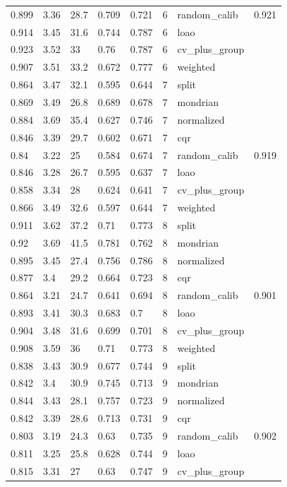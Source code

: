 \begin{tabular}{llllllll}
0.899 & 3.36 & 28.7 & 0.709 & 0.721 & 6 & random\_calib & 0.921 \\
0.914 & 3.45 & 31.6 & 0.744 & 0.787 & 6 & loao &  \\
0.923 & 3.52 & 33 & 0.76 & 0.787 & 6 & cv\_plus\_group &  \\
0.907 & 3.51 & 33.2 & 0.672 & 0.777 & 6 & weighted &  \\
0.864 & 3.47 & 32.1 & 0.595 & 0.644 & 7 & split &  \\
0.869 & 3.49 & 26.8 & 0.689 & 0.678 & 7 & mondrian &  \\
0.884 & 3.69 & 35.4 & 0.627 & 0.746 & 7 & normalized &  \\
0.846 & 3.39 & 29.7 & 0.602 & 0.671 & 7 & cqr &  \\
0.84 & 3.22 & 25 & 0.584 & 0.674 & 7 & random\_calib & 0.919 \\
0.846 & 3.28 & 26.7 & 0.595 & 0.637 & 7 & loao &  \\
0.858 & 3.34 & 28 & 0.624 & 0.641 & 7 & cv\_plus\_group &  \\
0.866 & 3.49 & 32.6 & 0.597 & 0.644 & 7 & weighted &  \\
0.911 & 3.62 & 37.2 & 0.71 & 0.773 & 8 & split &  \\
0.92 & 3.69 & 41.5 & 0.781 & 0.762 & 8 & mondrian &  \\
0.895 & 3.45 & 27.4 & 0.756 & 0.786 & 8 & normalized &  \\
0.877 & 3.4 & 29.2 & 0.664 & 0.723 & 8 & cqr &  \\
0.864 & 3.21 & 24.7 & 0.641 & 0.694 & 8 & random\_calib & 0.901 \\
0.893 & 3.41 & 30.3 & 0.683 & 0.7 & 8 & loao &  \\
0.904 & 3.48 & 31.6 & 0.699 & 0.701 & 8 & cv\_plus\_group &  \\
0.908 & 3.59 & 36 & 0.71 & 0.773 & 8 & weighted &  \\
0.838 & 3.43 & 30.9 & 0.677 & 0.744 & 9 & split &  \\
0.842 & 3.4 & 30.9 & 0.745 & 0.713 & 9 & mondrian &  \\
0.844 & 3.43 & 28.1 & 0.757 & 0.723 & 9 & normalized &  \\
0.842 & 3.39 & 28.6 & 0.713 & 0.731 & 9 & cqr &  \\
0.803 & 3.19 & 24.3 & 0.63 & 0.735 & 9 & random\_calib & 0.902 \\
0.811 & 3.25 & 25.8 & 0.628 & 0.744 & 9 & loao &  \\
0.815 & 3.31 & 27 & 0.63 & 0.747 & 9 & cv\_plus\_group &  \\

\end{tabular}
